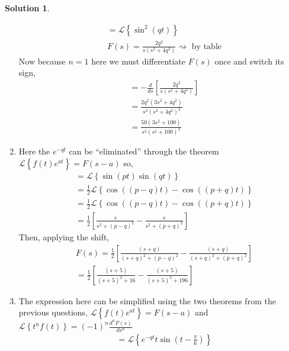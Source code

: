 \documentclass[10pt]{article}
\theoremstyle{definition}
\newtheorem{soln}{Solution}
\newcommand{\laplace}[1]{\mathcal{L}\left\{#1\right\}}
\begin{document}
\begin{soln}
\begin{enumerate}[label=(\alph*)]
          \begin{align*}
             & = \laplace{\sin^2\left(qt\right)}                                           \\
             & F(s)= \frac{2q^2}{s\left(s^2+4q^2\right)} \rightsquigarrow \text{ by table}
          \end{align*}
          Now because $n=1$ here we must differentiate $F(s)$ once and switch its sign,
          \begin{align*}
             & =-\frac{d}{ds}\left[\frac{2q^2}{s\left(s^2+4q^2\right)}\right] \\
             & =\frac{2q^2\left(3s^2+4q^2\right)}{s^2\left(s^2+4q^2\right)^2} \\
             & =\frac{50\left(3s^2+100\right)}{s^2\left(s^2+100\right)^2}
          \end{align*}
    \item Here the $e^{-qt}$ can be ``eliminated'' through the theorem $\laplace{f(t)e^{at}}=F(s-a)$ so,
          \begin{align*}
             & =\laplace{\sin\left(pt\right)\sin\left(qt\right)}                                           \\
             & =\frac{1}{2}\laplace{\cos\left(\left(p-q\right)t\right)-\cos\left(\left(p+q\right)t\right)} \\
             & =\frac{1}{2}\laplace{\cos\left(\left(p-q\right)t\right)-\cos\left(\left(p+q\right)t\right)} \\
             & =\frac{1}{2}\left[\frac{s}{s^2+\left(p-q\right)^2}-\frac{s}{s^2+\left(p+q\right)^2}\right]
          \end{align*}
          Then, applying the shift,
          \begin{align*}
             & F(s)=\frac{1}{2}\left[\frac{\left(s+q\right)}{\left(s+q\right)^2+\left(p-q\right)^2}-\frac{\left(s+q\right)}{\left(s+q\right)^2+\left(p+q\right)^2}\right] \\
             & =\frac{1}{2}\left[\frac{\left(s+5\right)}{\left(s+5\right)^2+16}-\frac{\left(s+5\right)}{\left(s+5\right)^2+196}\right]
          \end{align*}
    \item The expression here can be simplified using the two theorems from the previous questions, $\laplace{f(t)e^{at}}=F(s-a)$ and $\displaystyle\laplace{t^nf(t)}=\left(-1\right)^{n}\frac{d^nF(s)}{ds^n}$
          \begin{align*}
             & =\laplace{e^{-qt}t\sin\left(t-\frac{\pi}{6}\right)}                                                          \\

\end{align*}
\end{enumerate}
\end{soln}
\end{document}
